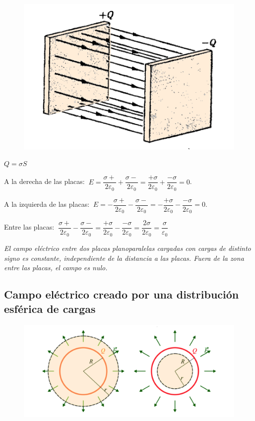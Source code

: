 \begin{figure}[H]
	\centering
	\includegraphics[width=.7\textwidth]{imagenes/imagenes23/T23IM09.png}
\end{figure}

$Q=\sigma S$

A la derecha de las placas: $\ E=\dfrac{\sigma+}{2\varepsilon_0}+\dfrac{\sigma-}{2\varepsilon_0}=\dfrac{+\sigma}{2\varepsilon_0}+\dfrac{-\sigma}{2\varepsilon_0}=0$.

 A la izquierda de las placas: $\ E=-\dfrac{\sigma+}{2\varepsilon_0}-\dfrac{\sigma-}{2\varepsilon_0}=-\dfrac{+\sigma}{2\varepsilon_0}-\dfrac{-\sigma}{2\varepsilon_0}=0$.

Entre las placas: $\ \dfrac{\sigma+}{2\varepsilon_0}-\dfrac{\sigma-}{2\varepsilon_0}=\dfrac{+\sigma}{2\varepsilon_0}-\dfrac{-\sigma}{2\varepsilon_0}=\dfrac{2\sigma}{2\varepsilon_0}=\dfrac{\sigma}{\varepsilon_0}$

\emph{El campo eléctrico entre dos placas  planoparalelas cargadas con cargas de distinto signo es constante, independiente de la distancia a las placas. Fuera de la zona entre las placas, el campo es nulo.}

\subsection{Campo eléctrico creado por una distribución esférica de cargas}

\begin{figure}[H]
	\centering
	\includegraphics[width=1\textwidth]{imagenes/imagenes23/T23IM10.png}
\end{figure}

